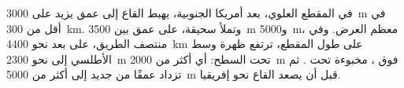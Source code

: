 \begin{example}
في المقطع العلوي، بعد  أمريكا الجنوبية، يهبط القاع إلى عمق يزيد على
\qty{3000}{m} في أقل من \qty{300}{km}. وتملأ  سحيقة، على عمق بين
\qty{3500}{m} و\qty{5000}{m}، معظم العرض. وفي منتصف الطريق، على بعد نحو
\qty{4400}{km} على طول المقطع، ترتفع ظهرة وسط الأطلسي إلى نحو \qty{2300}{m}
تحت السطح: أي أكثر من \qty{2000}{m} فوق ،  مخبوءة تحت .
ثم تزداد  عمقًا من جديد إلى أكثر من \qty{5000}{m} قبل أن يصعد القاع نحو
إفريقيا.
\end{example}

